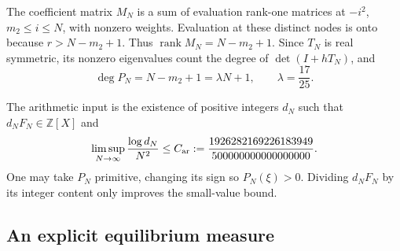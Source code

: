 \documentclass[11pt]{article}
\theoremstyle{definition}\newtheorem{definition}[theorem]{Definition}
\theoremstyle{remark}\newtheorem{remark}[theorem]{Remark}
\begin{document}
The coefficient matrix $M_N$ is a sum of evaluation rank-one matrices at
$-i^2$, $m_2\le i\le N$, with nonzero weights.  Evaluation at these distinct
nodes is onto because $r>N-m_2+1$.  Thus
$\operatorname{rank}M_N=N-m_2+1$.  Since $T_N$ is real symmetric, its nonzero
eigenvalues count the degree of $\det(I+hT_N)$, and
\begin{equation}\label{z3a:degree}
 \deg P_N=N-m_2+1=\lambda N+1,\qquad \lambda=\frac{17}{25}.
\end{equation}

The arithmetic input is the existence of positive integers $d_N$ such that
$d_NF_N\in\mathbb Z[X]$ and
\begin{equation}\label{z3a:arithmetic-input}
 \limsup_{N\to\infty}\frac{\log d_N}{N^2}
 \le C_{\rm ar}:=
 \frac{1926282169226183949}{500000000000000000}.
\end{equation}
One may take $P_N$ primitive, changing its sign so $P_N(\xi)>0$.
Dividing $d_NF_N$ by its integer content only improves the small-value bound.

\subsection{An explicit equilibrium measure}
\end{document}

